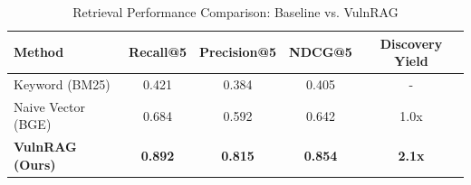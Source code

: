 \begin{table}[htbp]
\caption{Retrieval Performance Comparison: Baseline vs. VulnRAG}
\label{tab:performance}
\begin{center}
\begin{tabular}{@{}lcccc@{}}
\toprule
\textbf{Method} & \textbf{Recall@5} & \textbf{Precision@5} & \textbf{NDCG@5} & \textbf{Discovery Yield} \\ \midrule
Keyword (BM25) & 0.421 & 0.384 & 0.405 & - \\
Naive Vector (BGE) & 0.684 & 0.592 & 0.642 & 1.0x \\
\textbf{VulnRAG (Ours)} & \textbf{0.892} & \textbf{0.815} & \textbf{0.854} & \textbf{2.1x} \\ \bottomrule
\end{tabular}
\end{center}
\end{table}
